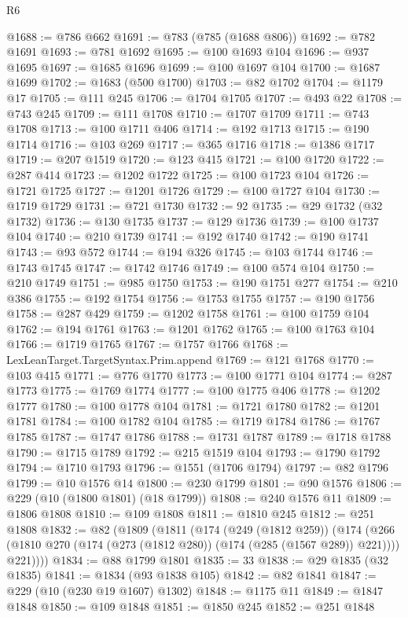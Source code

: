 \begin{lexlean}{R6}
\begin{coremodule}
@1688 := @786 @662
@1691 := @783 (@785 (@1688 @806))
@1692 := @782 @1691
@1693 := @781 @1692
@1695 := @100 @1693 @104
@1696 := @937 @1695
@1697 := @1685 @1696
@1699 := @100 @1697 @104
@1700 := @1687 @1699
@1702 := @1683 (@500 @1700)
@1703 := @82 @1702
@1704 := @1179 @17
@1705 := @111 @245
@1706 := @1704 @1705
@1707 := @493 @22
@1708 := @743 @245
@1709 := @111 @1708
@1710 := @1707 @1709
@1711 := @743 @1708
@1713 := @100 @1711 @406
@1714 := @192 @1713
@1715 := @190 @1714
@1716 := @103 @269
@1717 := @365 @1716
@1718 := @1386 @1717
@1719 := @207 @1519
@1720 := @123 @415
@1721 := @100 @1720
@1722 := @287 @414
@1723 := @1202 @1722
@1725 := @100 @1723 @104
@1726 := @1721 @1725
@1727 := @1201 @1726
@1729 := @100 @1727 @104
@1730 := @1719 @1729
@1731 := @721 @1730
@1732 := 92
@1735 := @29 @1732 (@32 @1732)
@1736 := @130 @1735
@1737 := @129 @1736
@1739 := @100 @1737 @104
@1740 := @210 @1739
@1741 := @192 @1740
@1742 := @190 @1741
@1743 := @93 @572
@1744 := @194 @326
@1745 := @103 @1744
@1746 := @1743 @1745
@1747 := @1742 @1746
@1749 := @100 @574 @104
@1750 := @210 @1749
@1751 := @985 @1750
@1753 := @190 @1751 @277
@1754 := @210 @386
@1755 := @192 @1754
@1756 := @1753 @1755
@1757 := @190 @1756
@1758 := @287 @429
@1759 := @1202 @1758
@1761 := @100 @1759 @104
@1762 := @194 @1761
@1763 := @1201 @1762
@1765 := @100 @1763 @104
@1766 := @1719 @1765
@1767 := @1757 @1766
@1768 := LexLeanTarget.TargetSyntax.Prim.append
@1769 := @121 @1768
@1770 := @103 @415
@1771 := @776 @1770
@1773 := @100 @1771 @104
@1774 := @287 @1773
@1775 := @1769 @1774
@1777 := @100 @1775 @406
@1778 := @1202 @1777
@1780 := @100 @1778 @104
@1781 := @1721 @1780
@1782 := @1201 @1781
@1784 := @100 @1782 @104
@1785 := @1719 @1784
@1786 := @1767 @1785
@1787 := @1747 @1786
@1788 := @1731 @1787
@1789 := @1718 @1788
@1790 := @1715 @1789
@1792 := @215 @1519 @104
@1793 := @1790 @1792
@1794 := @1710 @1793
@1796 := @1551 (@1706 @1794)
@1797 := @82 @1796
@1799 := @10 @1576 @14
@1800 := @230 @1799
@1801 := @90 @1576
@1806 := @229 (@10 (@1800 @1801) (@18 @1799))
@1808 := @240 @1576 @11
@1809 := @1806 @1808
@1810 := @109 @1808
@1811 := @1810 @245
@1812 := @251 @1808
@1832 := @82
    (@1809
      (@1811
        (@174
          (@249 (@1812 @259))
          (@174
            (@266 (@1810 @270 (@174 (@273 (@1812 @280)) (@174 (@285 (@1567 @289)) @221))))
            @221))))
@1834 := @88 @1799 @1801
@1835 := 33
@1838 := @29 @1835 (@32 @1835)
@1841 := @1834 (@93 @1838 @105)
@1842 := @82 @1841
@1847 := @229 (@10 (@230 @19 @1607) @1302)
@1848 := @1175 @11
@1849 := @1847 @1848
@1850 := @109 @1848
@1851 := @1850 @245
@1852 := @251 @1848

\end{coremodule}
\end{lexlean}
